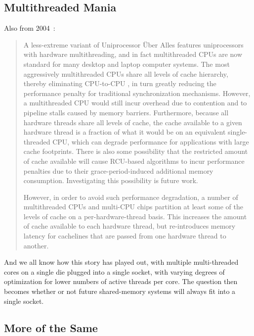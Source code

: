 \subsection{Multithreaded Mania}
\label{sec:future:Multithreaded Mania}

Also from 2004~\cite{PaulEdwardMcKenneyPhD}:

\begin{quote}
	A less-extreme variant of Uniprocessor \"Uber Alles features
	uniprocessors with hardware multithreading, and in fact
	multithreaded CPUs are now standard for many desktop and laptop
	computer systems.
	The most aggressively multithreaded CPUs share all levels of
	cache hierarchy, thereby eliminating CPU-to-CPU ,
	in turn greatly reducing the performance penalty for traditional
	synchronization mechanisms.
	However, a multithreaded CPU would still incur overhead due to
	contention and to pipeline stalls caused by memory barriers.
	Furthermore, because all hardware threads share all levels
	of cache, the cache available to a given hardware thread is a
	fraction of what it would be on an equivalent single-threaded
	CPU, which can degrade performance for applications with large
	cache footprints.
	There is also some possibility that the restricted amount of cache
	available will cause RCU-based algorithms to incur performance
	penalties due to their grace-period-induced additional memory
	consumption.
	Investigating this possibility is future work.

	However, in order to avoid such performance degradation, a number
	of multithreaded CPUs and multi-CPU chips partition at least
	some of the levels of cache on a per-hardware-thread basis.
	This increases the amount of cache available to each hardware
	thread, but re-introduces memory latency for cachelines that
	are passed from one hardware thread to another.
\end{quote}

And we all know how this story has played out, with multiple multi-threaded
cores on a single die plugged into a single socket, with varying degrees
of optimization for lower numbers of active threads per core.
The question then becomes whether or not future shared-memory systems will
always fit into a single socket.

\subsection{More of the Same}
\label{sec:meas:More of the Same}

